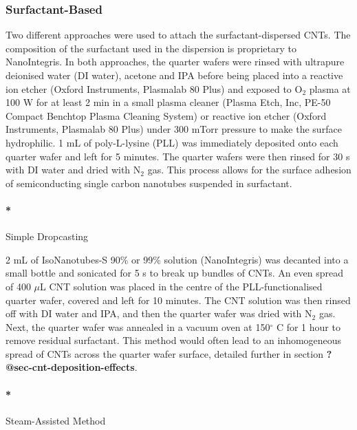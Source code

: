 \documentclass[
  letterpaper,
  DIV=11,
  numbers=noendperiod]{scrartcl}
\let\oldparagraph\paragraph
\renewcommand{\paragraph}[1]{\oldparagraph{#1}\mbox{}}
\begin{document}
\hypertarget{surfactant-based}{%
\subsubsection{Surfactant-Based}\label{surfactant-based}}

Two different approaches were used to attach the surfactant-dispersed
CNTs. The composition of the surfactant used in the dispersion is
proprietary to NanoIntegris. In both approaches, the quarter wafers were
rinsed with ultrapure deionised water (DI water), acetone and IPA before
being placed into a reactive ion etcher (Oxford Instruments, Plasmalab
80 Plus) and exposed to O\(_2\) plasma at 100 W for at least 2 min in a
small plasma cleaner (Plasma Etch, Inc, PE-50 Compact Benchtop Plasma
Cleaning System) or reactive ion etcher (Oxford Instruments, Plasmalab
80 Plus) under 300 mTorr pressure to make the surface hydrophilic. 1 mL
of poly-L-lysine (PLL) was immediately deposited onto each quarter wafer
and left for 5 minutes. The quarter wafers were then rinsed for 30 s
with DI water and dried with N\(_2\) gas. This process allows for the
surface adhesion of semiconducting single carbon nanotubes suspended in
surfactant.

\hypertarget{simple-dropcasting}{%
\paragraph*{Simple Dropcasting}\label{simple-dropcasting}}

2 mL of IsoNanotubes-S 90\% or 99\% solution (NanoIntegris) was decanted
into a small bottle and sonicated for 5 s to break up bundles of CNTs.
An even spread of 400 \(\mu\)L CNT solution was placed in the centre of
the PLL-functionalised quarter wafer, covered and left for 10 minutes.
The CNT solution was then rinsed off with DI water and IPA, and then the
quarter wafer was dried with N\(_2\) gas. Next, the quarter wafer was
annealed in a vacuum oven at 150\(^\circ\) C for 1 hour to remove
residual surfactant. This method would often lead to an inhomogeneous
spread of CNTs across the quarter wafer surface, detailed further in
section \textbf{?@sec-cnt-deposition-effects}.

\hypertarget{steam-assisted-method}{%
\paragraph*{Steam-Assisted Method}\label{steam-assisted-method}}
\end{document}
